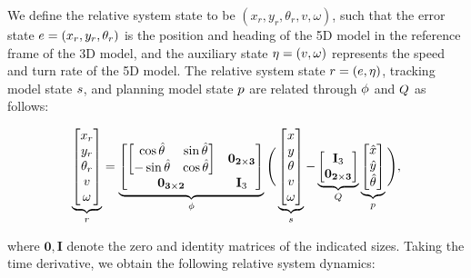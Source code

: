 We define the relative system state to be $(x_r, y_r, \theta_r, v, \omega)$, such that the error state $e=(x_r, y_r, \theta_r)$ is the position and heading of the 5D model in the reference frame of the 3D model, and the auxiliary state $\eta = (v, \omega)$ represents the speed and turn rate of the 5D model.
The relative system state $r = (e, \eta)$, tracking model state $s$, and planning model state $p$ are related through $\phi$ and $Q$ as follows:

\begin{equation}\small
\label{eq:5D_and_3D_err_state}
\underbrace{
\begin{bmatrix}
x_r\\
y_r\\
\theta_r \\
v \\
\omega
\end{bmatrix}
}_\rstate
=
\underbrace{
\begin{bmatrix}
  \begin{bmatrix}
  \cos\hat\theta & \sin\hat\theta \\
  -\sin\hat\theta & \cos\hat\theta
  \end{bmatrix} & \mathbf{0_{2\times 3}} \\
  \mathbf{0_{3\times 2}} & \mathbf I_3
\end{bmatrix}
}_\rtrans
\Bigg(
\underbrace{
\begin{bmatrix}
x\\
y\\
\theta \\
v \\
\omega
\end{bmatrix}
}_\tstate -
\underbrace{
\begin{bmatrix}
\mathbf I_3 \\
\mathbf{0_{2\times 3}}
\end{bmatrix}
}_\ptmat
\underbrace{
\begin{bmatrix}
\hat x\\
\hat y \\
\hat \theta \\
\end{bmatrix}
}_\pstate
\Bigg),
\end{equation}

\noindent where $\mathbf 0, \mathbf I$ denote the zero and identity matrices of the indicated sizes.
Taking the time derivative, we obtain the following relative system dynamics:

